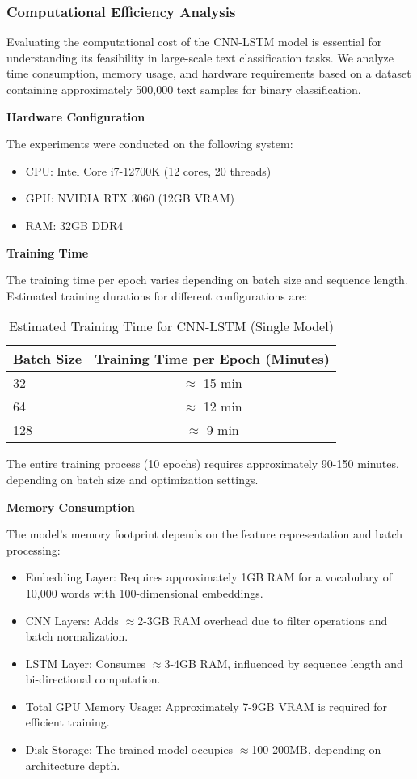 \subsubsection{Computational Efficiency Analysis}

Evaluating the computational cost of the CNN-LSTM model is essential for understanding its feasibility in large-scale text classification tasks. We analyze time consumption, memory usage, and hardware requirements based on a dataset containing approximately 500,000 text samples for binary classification.

\textbf{Hardware Configuration}

The experiments were conducted on the following system:\begin{itemize}
\item CPU: Intel Core i7-12700K (12 cores, 20 threads)\item GPU: NVIDIA RTX 3060 (12GB VRAM)\item RAM: 32GB DDR4\end{itemize}

\textbf{Training Time}

The training time per epoch varies depending on batch size and sequence length. Estimated training durations for different configurations are:

\begin{table}[H]
    \centering
    \caption{Estimated Training Time for CNN-LSTM (Single Model)}
    \label{tab:cnn-lstm-training-time}
    \begin{tabular}{|l|c|}
    \hline
    \textbf{Batch Size} & \textbf{Training Time per Epoch (Minutes)} \\
    \hline
    32 & $\approx$ 15 min \\
    \hline
    64 & $\approx$ 12 min \\
    \hline
    128 & $\approx$ 9 min \\
    \hline
    \end{tabular}
\end{table}
    

The entire training process (10 epochs) requires approximately 90-150 minutes, depending on batch size and optimization settings.

\textbf{Memory Consumption}

The model’s memory footprint depends on the feature representation and batch processing:

\begin{itemize}
\item Embedding Layer: Requires approximately 1GB RAM for a vocabulary of 10,000 words with 100-dimensional embeddings.
\item CNN Layers: Adds $\approx$2-3GB RAM overhead due to filter operations and batch normalization.
\item LSTM Layer: Consumes $\approx$3-4GB RAM, influenced by sequence length and bi-directional computation.
\item Total GPU Memory Usage: Approximately 7-9GB VRAM is required for efficient training.
\item Disk Storage: The trained model occupies $\approx$100-200MB, depending on architecture depth.
\end{itemize}

